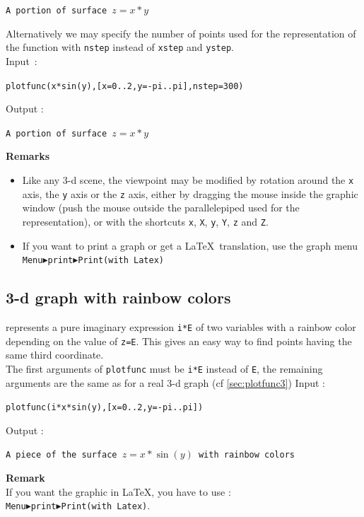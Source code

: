 \documentclass[a4paper,11pt]{book}
\begin{document}
\begin{center}{\tt A portion of surface $z=x*y$}\end{center}
Alternatively we may specify 
the number of points used for the representation of the
function with \verb|nstep| instead of \verb|xstep| and \verb|ystep|.\\
Input~:
\begin{center}{\tt plotfunc(x*sin(y),[x=0..2,y=-pi..pi],nstep=300)}\end{center}
Output :
\begin{center}{\tt A portion of surface $z=x*y$}\end{center}
{\bf Remarks}
\begin{itemize}
\item
Like any 3-d scene, the viewpoint may be modified by rotation 
around the {\tt x} axis, the {\tt y} axis or the
{\tt z} axis, either by dragging the mouse inside the graphic 
window (push the mouse outside the parallelepiped used for 
the representation), or with the shortcuts
{\tt x}, {\tt X}, {\tt y}, {\tt Y}, {\tt z} and {\tt Z}.
\item
If you want to print a graph or get a \LaTeX\ translation, use the graph
menu\\
{\tt Menu$\blacktriangleright$print$\blacktriangleright$Print(with
  Latex)}
\end{itemize}

\subsection{3-d graph with rainbow colors}\label{sec:plotfunc3d}
 represents a pure imaginary expression {\tt i*E}
of two variables with a rainbow color depending 
on the value of {\tt z=E}. This gives an easy way to 
find points having the same third coordinate.\\
The first arguments of {\tt plotfunc} must be {\tt i*E} instead of {\tt E},
the remaining arguments are the same 
as for a real 3-d graph (cf \ref{sec:plotfunc3})
Input :
\begin{center}{\tt plotfunc(i*x*sin(y),[x=0..2,y=-pi..pi]) }\end{center}
Output :
\begin{center}{\tt A piece of the surface $z=x*\sin(y)$ with rainbow colors}\end{center}
{\bf Remark}\\
 If you want the graphic in LaTeX, you have to use :\\
{\tt Menu$\blacktriangleright$print$\blacktriangleright$Print(with Latex)}. 
\end{document}
